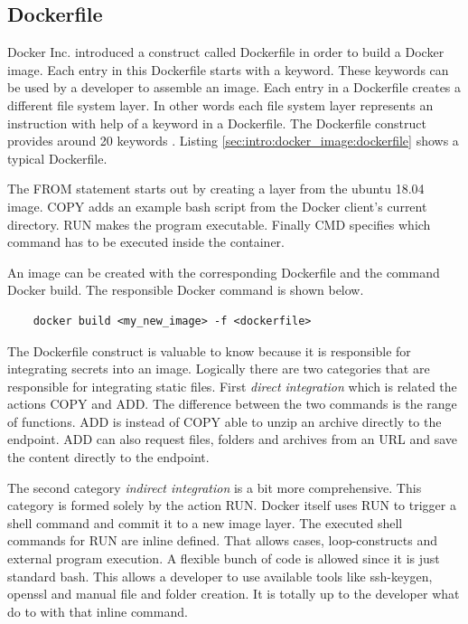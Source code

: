 \subsection{Dockerfile}
\label{sec:intro:docker_image:docker_img:dockerfile}
Docker Inc. introduced a construct called Dockerfile in order to build a Docker image.
Each entry in this Dockerfile starts with a keyword. These keywords can be used by a developer to assemble an image. Each entry in a Dockerfile creates a different file system layer. In other words each file system layer represents an instruction with help of a keyword in a Dockerfile.
The Dockerfile construct provides around 20 keywords \cite{dockerfile_ref}.
Listing \ref{sec:intro:docker_image:dockerfile} shows a typical Dockerfile.

The FROM statement starts out by creating a layer from the ubuntu 18.04 image. COPY adds an example bash script from the Docker client’s current directory. RUN makes the program executable. Finally CMD specifies which command has to be executed inside the container.

An image can be created with the corresponding Dockerfile and the command Docker build. The responsible Docker command is shown below.
\begin{lstlisting}
	docker build <my_new_image> -f <dockerfile>
\end{lstlisting}
The Dockerfile construct is valuable to know because it is responsible for integrating secrets into an image. 
Logically there are two categories that are responsible for integrating static files.
First \textit{direct integration} which is related the actions COPY and ADD. The difference between the two commands is the range of functions. ADD is instead of COPY able to unzip an archive directly to the endpoint.
ADD can also request files, folders and archives from an URL and save the content directly to the endpoint.

The second category \textit{indirect integration} is a bit more comprehensive. This category is formed solely by the action RUN.
Docker itself uses RUN to trigger a shell command and commit it to a new image layer.
The executed shell commands for RUN are inline defined. That allows cases, loop-constructs and external program execution. A flexible bunch of code is allowed since it is just standard bash. This allows a developer to use available tools like ssh-keygen, openssl and manual file and folder creation. It is totally up to the developer what do to with that inline command. 

